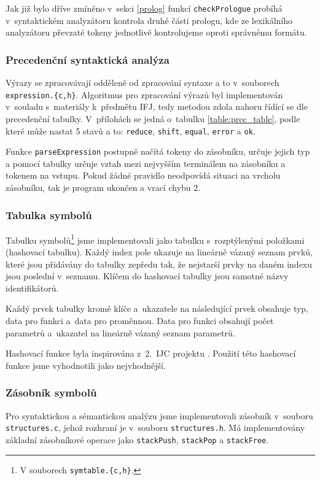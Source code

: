 \documentclass[a4paper,12pt]{article}
\begin{document}
Jak již bylo dříve zmíněno v~sekci \ref{prolog} funkcí \verb|checkPrologue| probíhá v~syntaktickém analyzátoru kontrola druhé části prologu, kde ze lexikálního analyzátoru převzaté tokeny jednotlivě kontrolujeme oproti správnému formátu.

\subsubsection{Precedenční syntaktická analýza}
Výrazy se zpracovávají odděleně od zpracování syntaxe a to v~souborech \verb|expression.{c,h}|. Algoritmus pro zpracování výrazů byl implementován v~souladu s~materiály k~předmětu IFJ, tedy metodou zdola nahoru řídící se dle precedenční tabulky. V~přílohách se jedná o~tabulku \ref{table:prec_table}, podle které může nastat 5 stavů a to: \verb|reduce|, \verb|shift|, \verb|equal|, \verb|error| a \verb|ok|.

Funkce \verb|parseExpression| postupně načítá tokeny do zásobníku, určuje jejich typ a pomocí tabulky určuje vztah mezi nejvyšším terminálem na zásobníku a tokenem na vstupu. Pokud žádné pravidlo neodpovídá situaci na vrcholu zásobníku, tak je program ukončen a vrací chybu 2.


\subsubsection{Tabulka symbolů}
Tabulku symbolů\footnote{V souborech \verb|symtable.{c,h}|.} jsme implementovali jako tabulku s~rozptýlenými položkami (hashovací tabulku). Každý index pole ukazuje na lineárně vázaný seznam prvků, které jsou přidávány do tabulky zepředu tak, že nejstarší prvky na daném indexu jsou poslední v~seznamu. Klíčem do hashovací tabulky jsou samotné názvy identifikátorů.

Každý prvek tabulky kromě klíče a~ukazatele na následující prvek obsahuje typ, data pro funkci a~data pro proměnnou. Data pro funkci obsahují počet parametrů a~ukazatel na lineárně vázaný seznam parametrů.

Hashovací funkce byla inspirována z~2.~IJC projektu \cite{IJC2DU}. Použití této hashovací funkce jsme vyhodnotili jako nejvhodnější.

\subsubsection{Zásobník symbolů}
Pro syntaktickou a sémantickou analýzu jsme implementovali zásobník v~souboru \verb|structures.c|, jehož rozhraní je v~souboru \verb|structures.h|. Má implementovány základní zásobníkové operace jako \verb|stackPush|, \verb|stackPop| a \verb|stackFree|.
\end{document}

